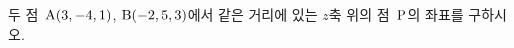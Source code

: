 두 점~$\mathrm{A}(3{,}\mkern3mu\mathopen{}-4{,}\mkern3mu\mathopen{}1)$, $\mathrm{B}(-2{,}\mkern3mu\mathopen{}5{,}\mkern3mu\mathopen{}3)$에서 같은 거리에 있는 $z$축 위의 점~$\mathrm{P}$의 좌표를 구하시오.
